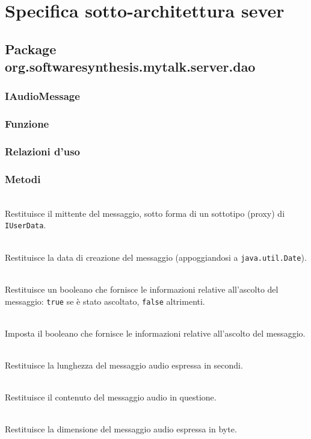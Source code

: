 \clearpage

\section{Specifica sotto-architettura sever}\label{sec:serverarchitecture}

\subsection{Package org.softwaresynthesis.mytalk.server.dao}\label{sec:dao}

\subsubsection{IAudioMessage}\label{sec:iaudiomessage}
\subsubsection*{Funzione}

\subsubsection*{Relazioni d'uso}


\subsubsection*{Metodi}
\begin{description}
  \item{}\\
Restituisce il mittente del messaggio, sotto forma di un sottotipo (proxy) di \texttt{IUserData}.
  \item{}\\
Restituisce la data di creazione del messaggio (appoggiandosi a \texttt{java.util.Date}).
  \item{}\\
Restituisce un booleano che fornisce le informazioni relative all'ascolto del messaggio: \texttt{true} se è stato ascoltato, \texttt{false} altrimenti.
  \item{}\\
Imposta il booleano che fornisce le informazioni relative all'ascolto del messaggio.
  \item{}\\
Restituisce la lunghezza del messaggio audio espressa in secondi.
  \item{}\\
Restituisce il contenuto del messaggio audio in questione.
  \item{}\\
Restituisce la dimensione del messaggio audio espressa in byte.
\end{description}

